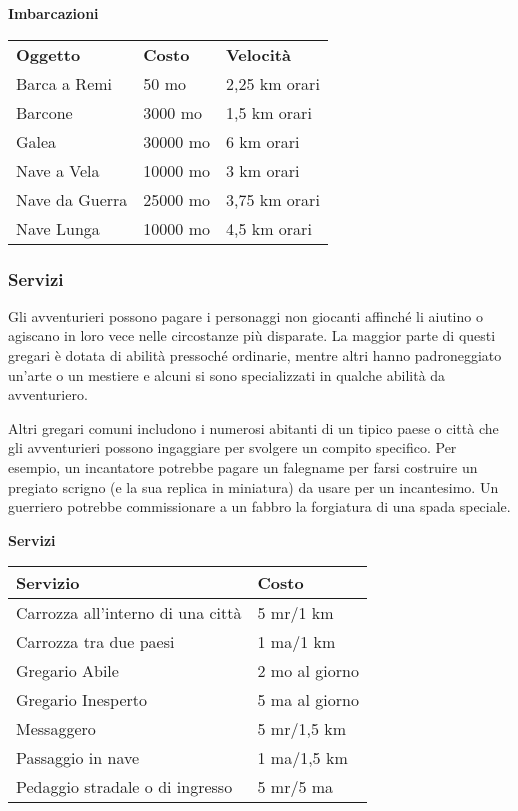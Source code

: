 \documentclass[12pt,a4paper,twoside,openany]{book}
\begin{document}
\begin{multicols}{2}
\bigskip

\textbf{Imbarcazioni}\\
\begin{tabularx}{0.45\textwidth}{llX}
\toprule
\textbf{Oggetto}&\textbf{Costo}&\textbf{Velocità}\\
Barca a Remi&50 mo&2,25 km orari\\
Barcone&3000 mo&1,5 km orari\\
Galea&30000 mo&6 km orari\\
Nave a Vela&10000 mo&3 km orari\\
Nave da Guerra&25000 mo&3,75 km orari\\
Nave Lunga&10000 mo&4,5 km orari\\
\end{tabularx}

\subsubsection{Servizi}


Gli avventurieri possono pagare i personaggi non giocanti affinché li aiutino o agiscano in loro vece nelle circostanze più disparate. La maggior parte di questi gregari è dotata di abilità pressoché ordinarie, mentre altri hanno padroneggiato un'arte o un mestiere e alcuni si sono specializzati in qualche abilità da avventuriero.

Altri gregari comuni includono i numerosi abitanti di un tipico paese o città che gli avventurieri possono ingaggiare per svolgere un compito specifico. Per esempio, un incantatore potrebbe pagare un falegname per farsi costruire un pregiato scrigno (e la sua replica in miniatura) da usare per un incantesimo.
Un guerriero potrebbe commissionare a un fabbro la forgiatura di una spada speciale.

\medskip

\textbf{Servizi}

\bigskip

\begin{tabularx}{0.45\textwidth}{Xl}
\textbf{Servizio}&\textbf{Costo}\\
\toprule
Carrozza all'interno di una città&5 mr/1 km\\
Carrozza tra due paesi&1 ma/1 km\\
Gregario Abile&2 mo al giorno\\
Gregario Inesperto&5 ma al giorno\\
Messaggero&5 mr/1,5 km\\
Passaggio in nave&1 ma/1,5 km\\
Pedaggio stradale o di ingresso&5 mr/5 ma\\
\end{tabularx}



\end{multicols}
\end{document}
